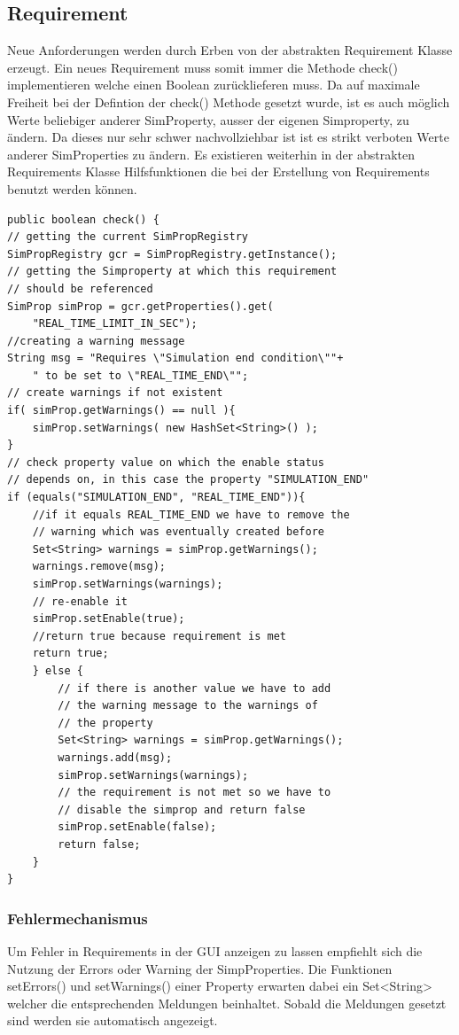 \documentclass[a4paper, 11pt]{article} %
\begin{document}
\subsection{Requirement}
\label{ssub:Requirements}
Neue Anforderungen werden durch Erben von der abstrakten Requirement Klasse erzeugt. Ein neues Requirement muss somit immer die Methode check() implementieren welche einen Boolean zurücklieferen muss. Da auf maximale Freiheit bei der Defintion der check() Methode gesetzt wurde, ist es auch möglich Werte beliebiger anderer SimProperty, ausser der eigenen Simproperty, zu ändern. Da dieses nur sehr schwer nachvollziehbar ist ist es strikt verboten Werte anderer SimProperties zu ändern.
Es existieren weiterhin in der abstrakten Requirements Klasse Hilfsfunktionen die bei der Erstellung von Requirements benutzt werden können.
\begin{lstlisting}[caption={Beispiel: check() Methode einer Enable Anforderung}]
public boolean check() {
// getting the current SimPropRegistry
SimPropRegistry gcr = SimPropRegistry.getInstance();
// getting the Simproperty at which this requirement 
// should be referenced
SimProp simProp = gcr.getProperties().get(
	"REAL_TIME_LIMIT_IN_SEC");
//creating a warning message
String msg = "Requires \"Simulation end condition\""+
 	" to be set to \"REAL_TIME_END\"";
// create warnings if not existent
if( simProp.getWarnings() == null ){
	simProp.setWarnings( new HashSet<String>() );
}
// check property value on which the enable status 
// depends on, in this case the property "SIMULATION_END"
if (equals("SIMULATION_END", "REAL_TIME_END")){
	//if it equals REAL_TIME_END we have to remove the 
	// warning which was eventually created before
	Set<String> warnings = simProp.getWarnings();
	warnings.remove(msg);
	simProp.setWarnings(warnings);
	// re-enable it
	simProp.setEnable(true);
	//return true because requirement is met
	return true;
	} else {
		// if there is another value we have to add 
		// the warning message to the warnings of 
		// the property
		Set<String> warnings = simProp.getWarnings();
		warnings.add(msg);
		simProp.setWarnings(warnings);
		// the requirement is not met so we have to 
		// disable the simprop and return false
		simProp.setEnable(false);
		return false;
	}
}
\end{lstlisting}
\subsubsection{Fehlermechanismus}
Um Fehler in Requirements in der GUI anzeigen zu lassen empfiehlt sich die Nutzung der Errors oder Warning der SimpProperties. Die Funktionen setErrors() und setWarnings() einer Property erwarten dabei ein Set<String> welcher die entsprechenden Meldungen beinhaltet. Sobald die Meldungen gesetzt sind werden sie automatisch angezeigt. 
\end{document}
